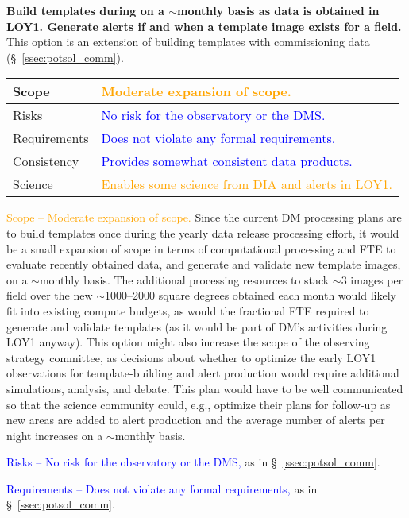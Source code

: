 \documentclass[DM,lsstdraft,toc]{lsstdoc}
\begin{document}
{\bf Build templates during on a $\sim$monthly basis as data is obtained in LOY1. Generate alerts if and when a template image exists for a field.} This option is an extension of building templates with commissioning data (\S~\ref{ssec:potsol_comm}).

\begin{center}
\begin{tabular}{|p{2.5cm}|p{13cm}|}
\hline
Scope & \textcolor{orange}{Moderate expansion of scope.} \\
\hline
Risks & \textcolor{blue}{No risk for the observatory or the DMS.} \\
\hline
Requirements & \textcolor{blue}{Does not violate any formal requirements.} \\
\hline
Consistency & \textcolor{blue}{Provides somewhat consistent data products.} \\
\hline
Science & \textcolor{orange}{Enables some science from DIA and alerts in LOY1.} \\
\hline
\end{tabular}
\end{center}

\textcolor{orange}{ Scope -- Moderate expansion of scope.} Since the current DM processing plans are to build templates once during the yearly data release processing effort, it would be a small expansion of scope in terms of computational processing and FTE to evaluate recently obtained data, and generate and validate new template images, on a $\sim$monthly basis. The additional processing resources to stack $\sim$3 images per field over the new $\sim$1000--2000 square degrees obtained each month would likely fit into existing compute budgets, as would the fractional FTE required to generate and validate templates (as it would be part of DM's activities during LOY1 anyway). This option might also increase the scope of the observing strategy committee, as decisions about whether to optimize the early LOY1 observations for template-building and alert production would require additional simulations, analysis, and debate. This plan would have to be well communicated so that the science community could, e.g., optimize their plans for follow-up as new areas are added to alert production and the average number of alerts per night increases on a $\sim$monthly basis.

\textcolor{blue}{ Risks -- No risk for the observatory or the DMS,} as in \S~\ref{ssec:potsol_comm}. 

\textcolor{blue}{ Requirements -- Does not violate any formal requirements,} as in \S~\ref{ssec:potsol_comm}. 
\end{document}
